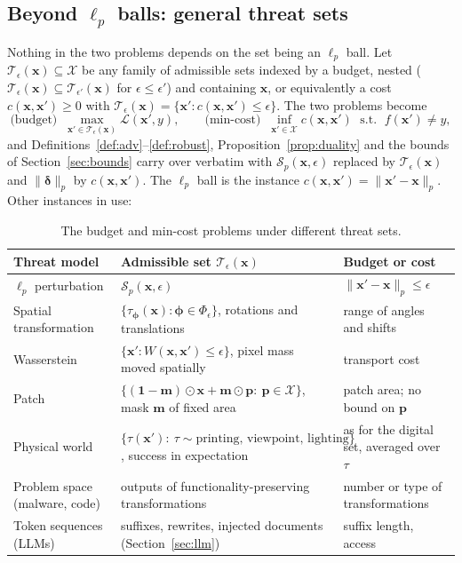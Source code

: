 \documentclass[10pt,a4paper]{extarticle}
\theoremstyle{definition}
\newcommand{\X}{\mathcal{X}}
\newcommand{\Loss}{\mathcal{L}}
\newcommand{\x}{\mathbf{x}}
\newcommand{\xadv}{\mathbf{x}'}
\newcommand{\bdelta}{\boldsymbol{\delta}}
\newcommand{\T}{\mathcal{T}}
\begin{document}
\subsection{Beyond \texorpdfstring{\(\ell_p\)}{lp} balls: general threat sets}\label{sec:threatsets}

Nothing in the two problems depends on the set being an \(\ell_p\) ball. Let \(\T_\epsilon(\x)\subseteq\X\) be any family of admissible sets indexed by a budget, nested (\(\T_{\epsilon}(\x)\subseteq\T_{\epsilon'}(\x)\) for \(\epsilon\le\epsilon'\)) and containing \(\x\), or equivalently a cost \(c(\x,\xadv)\ge0\) with \(\T_\epsilon(\x)=\{\xadv: c(\x,\xadv)\le\epsilon\}\). The two problems become
\[
\text{(budget)}\;\;\max_{\xadv\in\T_\epsilon(\x)}\Loss(\xadv,y),
\qquad
\text{(min-cost)}\;\;\inf_{\xadv\in\X}c(\x,\xadv)\;\text{ s.t. }\;f(\xadv)\neq y,
\]
and Definitions~\ref{def:adv}--\ref{def:robust}, Proposition~\ref{prop:duality} and the bounds of Section~\ref{sec:bounds} carry over verbatim with \(\mathcal{S}_p(\x,\epsilon)\) replaced by \(\T_\epsilon(\x)\) and \(\|\bdelta\|_p\) by \(c(\x,\xadv)\). The \(\ell_p\) ball is the instance \(c(\x,\xadv)=\|\xadv-\x\|_p\). Other instances in use:

\begin{table}[h]
\centering
\small
\renewcommand{\arraystretch}{1.15}
\begin{tabularx}{\textwidth}{@{}l X X@{}}
\toprule
Threat model & Admissible set \(\T_\epsilon(\x)\) & Budget or cost \\
\midrule
\(\ell_p\) perturbation & \(\mathcal{S}_p(\x,\epsilon)\) & \(\|\xadv-\x\|_p\le\epsilon\) \\
Spatial transformation & \(\{\tau_{\boldsymbol{\phi}}(\x):\boldsymbol{\phi}\in\Phi_\epsilon\}\), rotations and translations \citep{engstrom2019exploring} & range of angles and shifts \\
Wasserstein & \(\{\xadv: W(\x,\xadv)\le\epsilon\}\), pixel mass moved spatially \citep{wong2019wasserstein} & transport cost \\
Patch & \(\{(\mathbf{1}-\mathbf{m})\odot\x+\mathbf{m}\odot\mathbf{p}:\ \mathbf{p}\in\X\}\), mask \(\mathbf{m}\) of fixed area \citep{brown2017adversarial} & patch area; no bound on \(\mathbf{p}\) \\
Physical world & \(\{\tau(\xadv):\ \tau\sim\text{printing, viewpoint, lighting}\}\), success in expectation \citep{athalye2018eot} & as for the digital set, averaged over \(\tau\) \\
Problem space (malware, code) & outputs of functionality-preserving transformations \citep{pierazzi2020intriguing} & number or type of transformations \\
Token sequences (LLMs) & suffixes, rewrites, injected documents (Section~\ref{sec:llm}) & suffix length, access \\
\bottomrule
\end{tabularx}
\caption{The budget and min-cost problems under different threat sets.}
\label{tab:threatsets}
\end{table}
\end{document}
